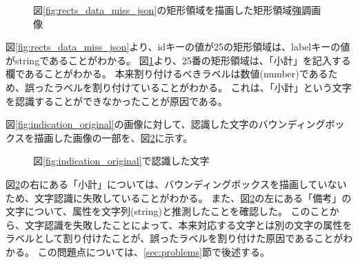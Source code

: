 \begin{figure}[tp]
    \begin{center}
        \caption{図\ref{fig:rects_data_miss_json}の矩形領域を描画した矩形領域強調画像}
        \label{fig:highlighted_rects_miss_part}
    \end{center}
\end{figure}

図\ref{fig:rects_data_miss_json}より、idキーの値が25の矩形領域は、labelキーの値がstringであることがわかる。
図\ref{fig:highlighted_rects_miss_part}より、25番の矩形領域は、「小計」を記入する欄であることがわかる。
本来割り付けるべきラベルは数値(number)であるため、誤ったラベルを割り付けていることがわかる。
これは、「小計」という文字を認識することができなかったことが原因である。

図\ref{fig:indication_original}の画像に対して、認識した文字のバウンディングボックスを描画した画像の一部を、図\ref{fig:OCR_result}に示す。

\begin{figure}[tp]
    \begin{center}
        \caption{図\ref{fig:indication_original}で認識した文字}
        \label{fig:OCR_result}
    \end{center}
\end{figure}

図\ref{fig:OCR_result}の右にある「小計」については、バウンディングボックスを描画していないため、文字認識に失敗していることがわかる。
また、図\ref{fig:OCR_result}の左にある「備考」の文字について、属性を文字列(string)と推測したことを確認した。
このことから、文字認識を失敗したことによって、本来対応する文字とは別の文字の属性をラベルとして割り付けたことが、誤ったラベルを割り付けた原因であることがわかる。
この問題点については、\ref{sec:problems}節で後述する。

